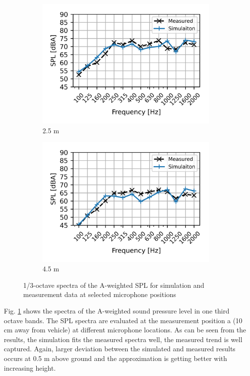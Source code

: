\begin{figure}[H] \ContinuedFloat
	\begin{subfigure}[b]{0.49\textwidth}
		\centering
		\includegraphics{fig/chap5/initial_model/freq_spectrum/pos_10cm_2pt5m.png}
		\caption{2.5 m}
	\end{subfigure}
	\begin{subfigure}[b]{0.49\textwidth}
		\centering
		\includegraphics{fig/chap5/initial_model/freq_spectrum/pos_10cm_4pt5m.png}
		\caption{4.5 m}
	\end{subfigure}
	\caption{1/3-octave spectra of the A-weighted SPL for simulation and measurement data at selected microphone positions}
	\label{fig:freq_spectrum}
\end{figure}

Fig. \ref{fig:freq_spectrum} shows the spectra of the A-weighted sound pressure level in one third octave bands. The SPL spectra are evaluated at the measurement position a (10 cm away from vehicle) at different microphone locations. As can be seen from the results, the simulation fits the measured spectra well, the measured trend is well captured. Again, larger deviation between the simulated and measured results occurs at 0.5 m above ground and the approximation is getting better with increasing height.

